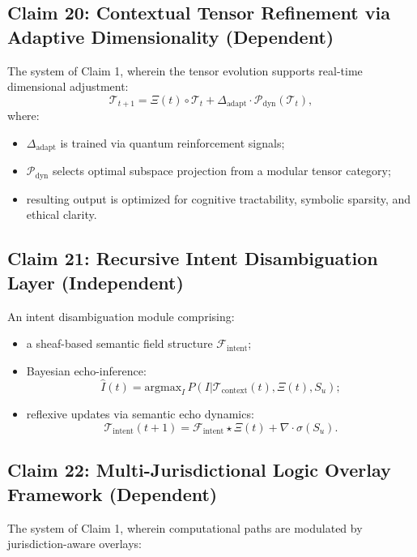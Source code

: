 \documentclass[12pt]{article}
\begin{document}
\subsection*{Claim 20: Contextual Tensor Refinement via Adaptive Dimensionality (Dependent)}

The system of Claim 1, wherein the tensor evolution supports real-time dimensional adjustment:
\[
\mathcal{T}_{t+1} = \Xi(t) \circ \mathcal{T}_t + \Delta_{\text{adapt}} \cdot \mathcal{P}_{\text{dyn}}(\mathcal{T}_t),
\]
where:

\begin{itemize}
    \item \( \Delta_{\text{adapt}} \) is trained via quantum reinforcement signals;
    \item \( \mathcal{P}_{\text{dyn}} \) selects optimal subspace projection from a modular tensor category;
    \item resulting output is optimized for cognitive tractability, symbolic sparsity, and ethical clarity.
\end{itemize}

\subsection*{Claim 21: Recursive Intent Disambiguation Layer (Independent)}

An intent disambiguation module comprising:

\begin{itemize}
    \item a sheaf-based semantic field structure \( \mathcal{F}_{\text{intent}} \);
    \item Bayesian echo-inference:
    \[
    \hat{I}(t) = \text{argmax}_I \, P(I | \mathcal{T}_{\text{context}}(t), \Xi(t), S_u);
    \]

    \item reflexive updates via semantic echo dynamics:
    \[
    \mathcal{T}_{\text{intent}}(t+1) = \mathcal{F}_{\text{intent}} \star \Xi(t) + \nabla \cdot \sigma(S_u).
    \]
\end{itemize}

\subsection*{Claim 22: Multi-Jurisdictional Logic Overlay Framework (Dependent)}

The system of Claim 1, wherein computational paths are modulated by jurisdiction-aware overlays:
\end{document}
